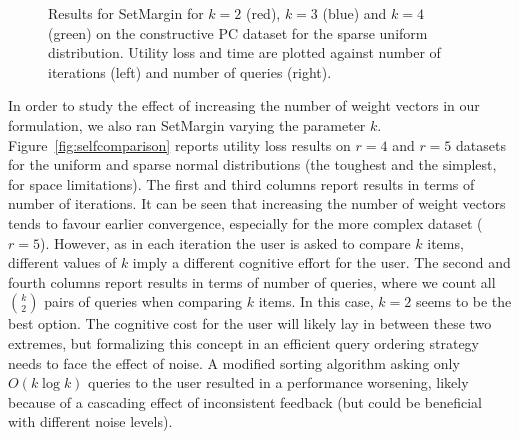 \documentclass{article}
\renewcommand\[{\begin{equation}}
\renewcommand\]{\end{equation}}
\begin{document}
\begin{figure}
{\begin{tabular}{lcccc}
        \\
    \end{tabular}
    }
    \caption{\label{fig:pc} Results for {\sc SetMargin} for $k=2$
      (red), $k=3$ (blue) and $k=4$ (green) on the constructive PC
      dataset for the sparse uniform distribution. Utility loss and
      time are plotted against number of iterations (left)
      and number of queries (right).}
\end{figure}


In order to study the effect of increasing the number of weight
vectors in our formulation, we also ran {\sc SetMargin} varying the
parameter $k$. Figure~\ref{fig:selfcomparison} reports utility loss
results on $r\!=\!4$ and $r\!=\!5$ datasets for the uniform and sparse normal
distributions (the toughest and the simplest, for space limitations).
The first and third columns report results in terms of number of
iterations. It can be seen that increasing the number of weight
vectors tends to favour earlier convergence, especially for the more
complex dataset ($r=5$). However, as in each iteration the user is
asked to compare $k$ items, different values of $k$ imply a different
cognitive effort for the user. The second and fourth columns report
results in terms of number of queries, where we count all
$k \choose 2$ pairs of queries when comparing $k$ items. In this case,
$k=2$ seems to be the best option. The cognitive cost for the user
will likely lay in between these two extremes, but formalizing this
concept in an efficient query ordering strategy needs to face the
effect of noise.  A modified sorting algorithm asking only
$O(k\log k)$ queries to the user resulted in a performance worsening,
likely because of a cascading effect of inconsistent feedback (but
could be beneficial with different noise levels).
\end{document}
